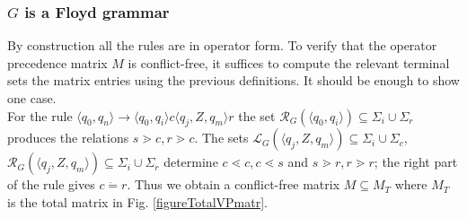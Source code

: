 \documentclass[3p,11pt]{elsarticle}
\begin{document}
\subsubsection*{$G$ is a Floyd grammar}
By construction all the rules are in operator form. To verify that the operator precedence matrix $M$ is conflict-free, it suffices to compute  the relevant terminal sets the matrix entries using  the previous definitions. It should be enough to show one case.
\\
 For the rule $\langle q_0,q_n \rangle\to \langle q_0,q_i \rangle c \langle q_j,Z,q_m \rangle r$ the set
$ \mathcal{R}_G(\langle q_0,q_i \rangle)\subseteq \Sigma_i \cup  \Sigma_r $ produces the relations $s\gtrdot c, r\gtrdot c$. The sets $ \mathcal{L}_G(\langle q_j,Z, q_m \rangle)\subseteq \Sigma_i \cup \Sigma_c$, $\mathcal{R}_G(\langle q_j,Z, q_m \rangle)\subseteq \Sigma_i \cup \Sigma_r$  determine $c\lessdot c, c\lessdot s$ and $s\gtrdot r, r\gtrdot r$; the right part of the rule gives $c\dot=r$. Thus we obtain a conflict-free matrix $M\subseteq M_{T}$ where $M_{T}$ is the total matrix in Fig. \ref{figureTotalVPmatr}.
\end{document}
